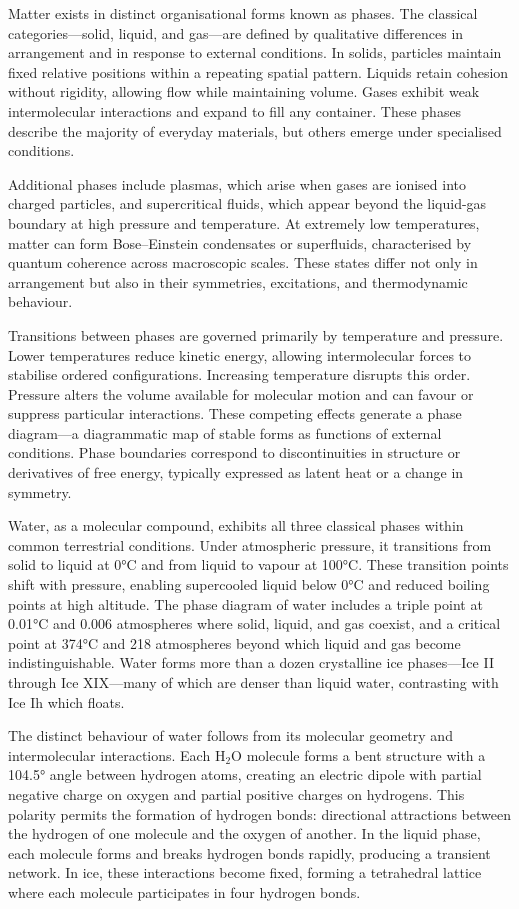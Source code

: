 Matter exists in distinct organisational forms known as phases. The classical categories—solid, liquid, and gas—are defined by qualitative differences in arrangement and in response to external conditions. In solids, particles maintain fixed relative positions within a repeating spatial pattern. Liquids retain cohesion without rigidity, allowing flow while maintaining volume. Gases exhibit weak intermolecular interactions and expand to fill any container. These phases describe the majority of everyday materials, but others emerge under specialised conditions.

Additional phases include plasmas, which arise when gases are ionised into charged particles, and supercritical fluids, which appear beyond the liquid-gas boundary at high pressure and temperature. At extremely low temperatures, matter can form Bose–Einstein condensates or superfluids, characterised by quantum coherence across macroscopic scales. These states differ not only in arrangement but also in their symmetries, excitations, and thermodynamic behaviour.

Transitions between phases are governed primarily by temperature and pressure. Lower temperatures reduce kinetic energy, allowing intermolecular forces to stabilise ordered configurations. Increasing temperature disrupts this order. Pressure alters the volume available for molecular motion and can favour or suppress particular interactions. These competing effects generate a phase diagram—a diagrammatic map of stable forms as functions of external conditions. Phase boundaries correspond to discontinuities in structure or derivatives of free energy, typically expressed as latent heat or a change in symmetry.

Water, as a molecular compound, exhibits all three classical phases within common terrestrial conditions. Under atmospheric pressure, it transitions from solid to liquid at 0°C and from liquid to vapour at 100°C. These transition points shift with pressure, enabling supercooled liquid below 0°C and reduced boiling points at high altitude. The phase diagram of water includes a triple point at 0.01°C and 0.006 atmospheres where solid, liquid, and gas coexist, and a critical point at 374°C and 218 atmospheres beyond which liquid and gas become indistinguishable. Water forms more than a dozen crystalline ice phases—Ice II through Ice XIX—many of which are denser than liquid water, contrasting with Ice Ih which floats.

The distinct behaviour of water follows from its molecular geometry and intermolecular interactions. Each H\(_2\)O molecule forms a bent structure with a 104.5° angle between hydrogen atoms, creating an electric dipole with partial negative charge on oxygen and partial positive charges on hydrogens. This polarity permits the formation of hydrogen bonds: directional attractions between the hydrogen of one molecule and the oxygen of another. In the liquid phase, each molecule forms and breaks hydrogen bonds rapidly, producing a transient network. In ice, these interactions become fixed, forming a tetrahedral lattice where each molecule participates in four hydrogen bonds.

